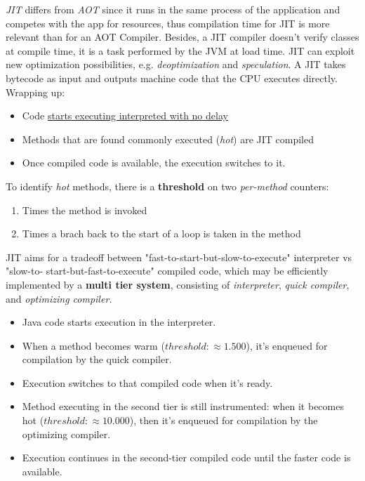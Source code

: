 \textit{JIT} differs from \textit{AOT} since it runs in the same process of the application and competes with the app for resources,
thus compilation time for JIT is more relevant than for an AOT Compiler.
Besides, a JIT compiler doesn't verify classes at compile time, it is a task performed by the JVM at load time. 
JIT can exploit new optimization possibilities, e.g. \textit{deoptimization} and \textit{speculation}.
A JIT takes bytecode as input and outputs machine code that the CPU executes directly.\\
Wrapping up:
\begin{itemize}
    \item Code \ul{starts executing interpreted with no delay}
    \item Methods that are found commonly executed (\textit{hot}) are JIT compiled
    \item Once compiled code is available, the execution switches to it.
\end{itemize}

To identify \textit{hot} methods, there is a \textbf{threshold} on two \textit{per-method} counters:
\begin{enumerate}
    \item Times the method is invoked
    \item Times a brach back to the start of a loop is taken in the method
\end{enumerate}

JIT aims for a tradeoff between "fast-to-start-but-slow-to-execute" interpreter vs "slow-to- start-but-fast-to-execute" compiled code, which may be efficiently implemented by a \textbf{multi tier system}, consisting of \textit{interpreter}, \textit{quick compiler}, and \textit{optimizing compiler.}

\begin{itemize}
	\item Java code starts execution in the interpreter.
	\item When a method becomes warm ($threshold: \approx 1.500$), it's
enqueued for compilation by the quick compiler.
	\item Execution switches to that compiled code when it's ready.
	\item Method executing in the second tier is still instrumented:
when it becomes hot ($threshold: \approx 10.000$), then it's
enqueued for compilation by the optimizing compiler.
	\item Execution continues in the second-tier compiled code until
the faster code is available.
\end{itemize}

